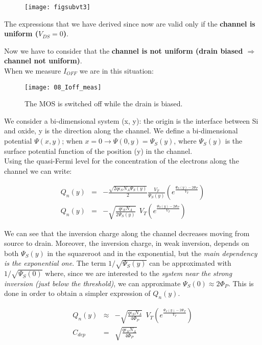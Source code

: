 \documentclass[a4paper, 12pt, twoside, openright]{report}
\begin{document}
	\begin{figure}[H]
	\centering
	\texttt{[image: figsubvt3]}
	\caption{}
	\label{}
	\end{figure}

The expressions that we have derived since now are valid only if the \textbf{channel is uniform ($V_{DS} = 0$)}.

Now we have to consider that the \textbf{channel is not uniform (drain biased $\Rightarrow$ channel not uniform)}.\\
When we measure $I_{OFF}$ we are in this situation:

	\begin{figure}[H]
	\centering
	\texttt{[image: 08\_Ioff\_meas]}
	\caption{The MOS is switched off while the drain is biased.}
	\label{}
	\end{figure}

We consider a bi-dimensional system (x, y): the origin is the interface between Si and oxide, y is the direction along the channel. We define a bi-dimensional potential $\Psi(x,y)$; when $x = 0 \rightarrow \Psi(0, y) = \Psi_S(y)$, where $\Psi_S(y)$ is the surface potential  function of the position (y) in the channel.\\
Using the quasi-Fermi level for the concentration of the electrons along the channel we can write:

  \begin{eqnarray*}
      Q_n(y)&=&-\frac{\sqrt{2q \epsilon_S N_A \Psi_S(y)}}{2} \frac{V_T}{\Psi_S(y)}
             \left(e^{\displaystyle \frac{\Psi_S(y)-2\Phi_P}{V_T}}
              \right)\\[2ex]
      Q_n(y)&=&-\sqrt{\frac{q \epsilon_S N_A}{2\Psi_S(y)}}~~ V_T
             \left(e^{\displaystyle \frac{\Psi_S(y)-2\Phi_P}{V_T}}
              \right)
     \end{eqnarray*}

We can see that the inversion charge along the channel decreases moving from source to drain. Moreover, the inversion charge, in weak inversion, depends on both $\Psi_S(y)$ in the squareroot and in the exponential, but the \emph{main dependency is the exponential one}. The term $1/\sqrt{\Psi_S(y)}$ can be approximated with $1/\sqrt{\Psi_S(0)}$ where, since we are interested to the \emph{system near the strong inversion (just below the threshold)}, we can approximate $\Psi_S(0) \approx 2\Phi_P$.
This is done in order to obtain a simpler expression of $Q_{n}(y)$.

	\begin{eqnarray*}
	      Q_n(y)&\approx &-\sqrt{\frac{q \epsilon_S N_A}{4\Phi_P}}~~V_T
	             \left(e^{\displaystyle \frac{\Psi_S(y)-2\Phi_P}{V_T}}
	              \right)\\[2ex]
	       C_{dep}&=& {\sqrt{\frac{q \epsilon_S N_A}{ 4\Phi_P}}}
	\end{eqnarray*}
\end{document}
